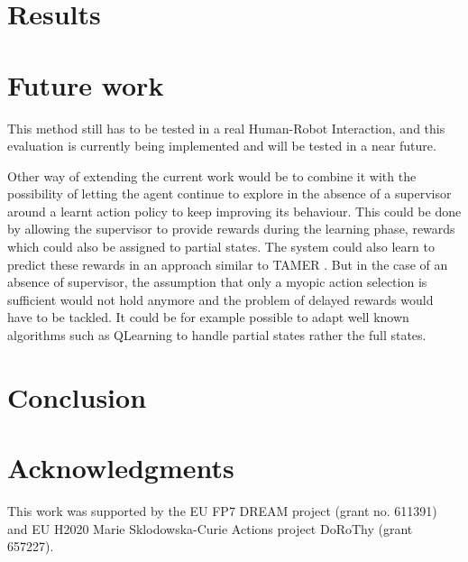 \documentclass[letterpaper]{article} %
\begin{document}
\section{Results}

\section{Future work}

This method still has to be tested in a real Human-Robot Interaction, and this
evaluation is currently being implemented and will be tested in a near future.

Other way of extending the current work would be to combine it with the
possibility of letting the agent continue to explore in the absence of a
supervisor around a learnt action policy to keep improving its behaviour. This
could be done by allowing the supervisor to provide rewards during the learning
phase, rewards which could also be assigned to partial states. The system could
also learn to predict these rewards in an approach similar to TAMER 
\cite{knox2009interactively}. But in the case of an absence of supervisor, the assumption that only a
myopic action selection is sufficient would not hold anymore and the problem of
delayed rewards would have to be tackled. It could be for example possible to
adapt well known algorithms such as QLearning to handle partial states rather
the full states.

\section{Conclusion}
\label{sec:conclusion}
\section{Acknowledgments}
This work was supported by the EU FP7 DREAM project (grant no.  611391) and EU
H2020 Marie Sklodowska-Curie Actions project DoRoThy (grant 657227).  

 
\end{document}
